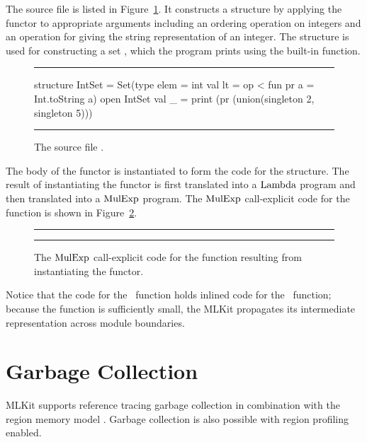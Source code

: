 \documentclass[12pt]{book}
\begin{document}
The source file  is listed in Figure~\ref{SetApp.fig}. It
constructs a structure  by applying the functor  to
appropriate arguments including an ordering operation on integers and an
operation for giving the string representation of an integer. The 
structure is used for constructing a set , which the program prints
using the built-in  function.
\begin{figure}[ht]
\hrule \medskip
\begin{smlcode}
  structure IntSet = Set(type elem = int
                         val lt = op <
                         fun pr a = Int.toString a)
  open IntSet
  val _ = print (pr (union(singleton 2, singleton 5)))
\end{smlcode}
\caption{The source file .}
\medskip \hrule \label{SetApp.fig}
\end{figure}

The body of the  functor is instantiated to form the code for the
 structure. The result of instantiating the  functor is first
translated into a $\hbox{\rm Lambda}$ program and then translated into a $\hbox{\rm MulExp}$
program. The $\hbox{\rm MulExp}$ call-explicit code for the  function is shown in
Figure~\ref{set_inst_mulexp.fig}.
\begin{figure}[ht]
\hrule \medskip
{}
\caption{The $\hbox{\rm MulExp}$ call-explicit code for the  function resulting
  from instantiating the  functor.}
\medskip \hrule
\label{set_inst_mulexp.fig}
\end{figure}

Notice that the code for the ~function holds inlined code for the
~function; because the function is sufficiently small, the MLKit
propagates its intermediate representation across module boundaries.

\chapter{Garbage Collection}
\label{gc.chap}
MLKit supports reference tracing garbage collection in combination with the
region memory model \cite{hallenberg99,het02}.  Garbage collection is also
possible with region profiling enabled.
\end{document}
